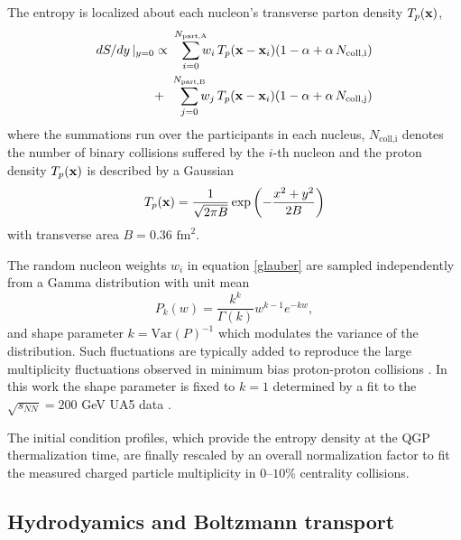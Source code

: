\documentclass[aps,prc,reprint,amsmath,nofootinbib,superscriptaddress]{revtex4-1}
\begin{document}
The entropy is localized about each nucleon's transverse parton density $T_p({\bf x})$,
\begin{eqnarray}
 dS/dy \,\vert_{y=0} &\propto& \smashoperator{\sum_{i=0}^{N_\text{part,A}}} w_i\, T_p({\bf x} - {\bf x}_i)(1-\alpha + \alpha\, N_\text{coll,i}) \nonumber \\
                     &+& \smashoperator{\sum_{j=0}^{N_\text{part,B}}} w_j\, T_p({\bf x} - {\bf x}_i)(1-\alpha + \alpha\, N_\text{coll,j})
 \label{glauber}
\end{eqnarray}
where the summations run over the participants in each nucleus, $N_\text{coll,i}$ denotes the number of binary collisions suffered by the $i$-th nucleon 
and the proton density $T_p({\bf x})$ is described by a Gaussian
\begin{equation}
 T_p({\bf x}) = \frac{1}{\sqrt{2 \pi B}} \exp \left(-\frac{x^2+y^2}{2 B} \right)
\end{equation}
with transverse area $B = 0.36$ $\text{fm}^2$.

The random nucleon weights $w_i$ in equation \eqref{glauber} are sampled independently from a Gamma distribution with unit mean
\begin{equation}
 P_k(w) = \frac{k^k}{\Gamma(k)} w^{k-1} e^{-k w},
\end{equation}
and shape parameter $k = \text{Var}(P)^{-1}$ which modulates the variance of the distribution. 
Such fluctuations are typically added to reproduce the large multiplicity fluctuations observed in minimum bias proton-proton collisions \cite{Adare:2008ns, Dumitru:2012yr, Moreland:2012qw, Bozek:2013uha, Shen:2014sfi}. 
In this work the shape parameter is fixed to $k=1$ determined by a fit to the $\sqrt{s_{NN}}=200$ GeV UA5 data \cite{Ansorge:1988kn}. 

The initial condition profiles, which provide the entropy density at the QGP thermalization time, are finally rescaled by an overall normalization factor to fit the measured charged particle multiplicity in $0$--$10\%$ centrality collisions.

\subsection{Hydrodyamics and Boltzmann transport}
\end{document}
